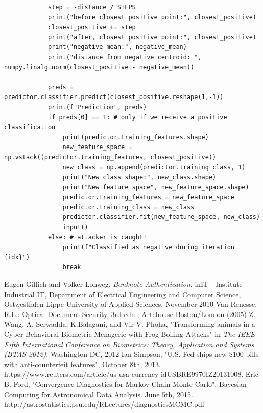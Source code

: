 \documentclass{article}
\begin{document}
\begin{appendices}
\begin{lstlisting}
            step = -distance / STEPS
            print("before closest positive point:", closest_positive)
            closest_positive += step
            print("after, closest positive point:", closest_positive)
            print("negative mean:", negative_mean)
            print("distance from negative centroid: ", numpy.linalg.norm(closest_positive - negative_mean))

            preds = predictor.classifier.predict(closest_positive.reshape(1,-1))
            print(f"Prediction", preds)
            if preds[0] == 1: # only if we receive a positive classification
                print(predictor.training_features.shape)
                new_feature_space = np.vstack((predictor.training_features, closest_positive))
                new_class = np.append(predictor.training_class, 1)
                print("New class shape:", new_class.shape)
                print("New feature space", new_feature_space.shape)
                predictor.training_features = new_feature_space
                predictor.training_class = new_class
                predictor.classifier.fit(new_feature_space, new_class)
                input()
            else: # attacker is caught!
                print(f"Classified as negative during iteration {idx}")
                break
 \end{lstlisting}
        
\end{appendices}


\begin{thebibliography}{9}
Eugen Gillich and Volker Lohweg. \textit{Banknote Authentication}. inIT - Institute Industrial IT, Department of Electrical Engineering and Computer Science, Ostwestfalen-Lippe University of Applied Sciences, November 2010
Van Renesse, R.L.: Optical Document Security, 3rd edn., Artehouse Boston/London
(2005)
 Z. Wang, A. Serwadda, K.Balagani, and Vir V. Phoha, "Transforming animals in a Cyber-Behavioral Biometric Menagerie with Frog-Boiling Attacks" in \textit{The IEEE Fifth International Conference on Biometrics: Theory, Application and Systems (BTAS 2012)}, Washington DC, 2012
Ian Simpson, "U.S. Fed ships new \$100 bills with anti-counterfeit features", October 8th, 2013. https://www.reuters.com/article/us-usa-currency-idUSBRE9970IZ20131008.
 Eric B. Ford, "Convergence Diagnostics for Markov Chain Monte Carlo", Bayesian Computing for Astronomical Data Analysis. June 5th, 2015. http://astrostatistics.psu.edu/RLectures/diagnosticsMCMC.pdf

\end{thebibliography}
\end{document}
